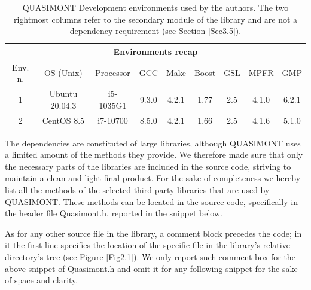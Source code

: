 \documentclass[a4paper, twosided]{book}
\begin{document}
\begin{table}[H]
\centering
\begin{tabular}{|c||c|c|c|c|c|c|c|c|}
\hline
\multicolumn{9}{|c|}{\textbf{Environments recap}} \\
\hline
Env. n. & OS (Unix) & Processor & GCC & Make & Boost & GSL & MPFR & GMP \\
\hline
1 & Ubuntu 20.04.3 & i5-1035G1 & 9.3.0 & 4.2.1 & 1.77 & 2.5 & 4.1.0 & 6.2.1 \\
2 & CentOS 8.5     & i7-10700  & 8.5.0 & 4.2.1 & 1.66 & 2.5 & 4.1.6 & 5.1.0 \\
\hline
\end{tabular}
  \caption{QUASIMONT Development environments used by the authors. The two rightmost columns refer to the secondary module of the library and are not a dependency requirement (see Section \ref{Sec3.5}).}
  \label{table2.1}
\end{table}

\noindent
The dependencies are constituted of large libraries, although QUASIMONT uses a limited amount of the methods they provide. We therefore made sure that only the necessary parts of the libraries are included in the source code, striving to maintain a clean and light final product. For the sake of completeness we hereby list all the methods of the selected third-party libraries  that are used by QUASIMONT.  These methods can be located in the source code, specifically in the header file \colorbox{poliGrayBlue}{Quasimont.h}, reported in the snippet below.

\vspace{0.2cm}

\newpage

\noindent
As for any other source file in the library, a comment block precedes the code; in it the first line specifies the location of the specific file in the library's relative directory's tree (see Figure \ref{Fig2.1}). We only report such comment box for the above snippet of \colorbox{poliGrayBlue}{Quasimont.h} and omit it for any following snippet for the sake of space and clarity.

\vspace{0.2cm}
\end{document}

